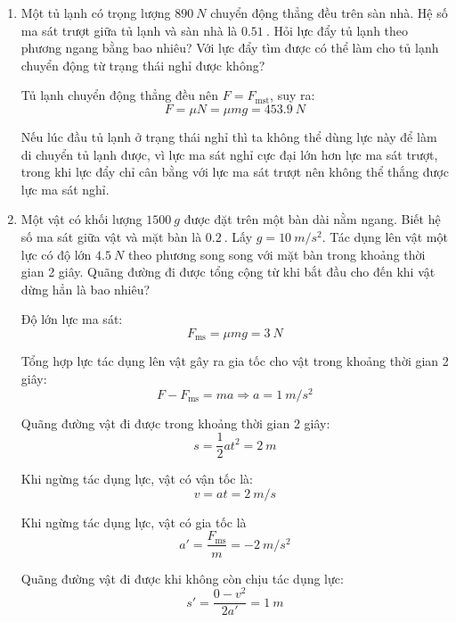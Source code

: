 \begin{enumerate}[label=\bfseries Câu \arabic*:]
	
	\item {}
	
	
	{Một tủ lạnh có trọng lượng $\SI{890}{N}$ chuyển động thẳng đều trên sàn nhà. Hệ số ma sát trượt giữa tủ lạnh và sàn nhà là $\SI{0.51}{}$. Hỏi lực đẩy tủ lạnh theo phương ngang bằng bao nhiêu? Với lực đẩy tìm được có thể làm cho tủ lạnh chuyển động từ trạng thái nghỉ được không?
		
	}
	
	\hideall
	{Tủ lạnh chuyển động thẳng đều nên $F=F_\text{mst}$, suy ra:
		$$F=\mu N = \mu mg = \SI{453.9}{N}$$
		
		Nếu lúc đầu tủ lạnh ở trạng thái nghỉ thì ta không thể dùng lực này để làm di chuyển tủ lạnh được, vì lực ma sát nghỉ cực đại lớn hơn lực ma sát trượt, trong khi lực đẩy chỉ cân bằng với lực ma sát trượt nên không thể thắng được lực ma sát nghỉ.
	}
	\item {}
	
	
	{Một vật có khối lượng $\SI{1500}{g}$ được đặt trên một bàn dài nằm ngang. Biết hệ số ma sát giữa vật và mặt bàn là $\SI{0.2}{}$. Lấy $g=\SI{10}{m/s^2}$. Tác dụng lên vật một lực có độ lớn $\SI{4.5}{N}$ theo phương song song với mặt bàn trong khoảng thời gian 2 giây. Quãng đường đi được tổng cộng từ khi bắt đầu cho đến khi vật dừng hẳn là bao nhiêu?
	}
	
	\hideall
	{
		Độ lớn lực ma sát:
		$$F_\text{ms} = \mu mg = \SI{3}{N}$$
		
		Tổng hợp lực tác dụng lên vật gây ra gia tốc cho vật trong khoảng thời gian 2 giây:
		$$F-F_\text{ms} = ma \Rightarrow a = \SI{1}{m/s^2}$$
		
		Quãng đường vật đi được trong khoảng thời gian 2 giây:
		$$s=\dfrac{1}{2}at^2 = \SI{2}{m}$$
		
		Khi ngừng tác dụng lực, vật có vận tốc là:
		$$v=at=\SI{2}{m/s}$$
		
		
		Khi ngừng tác dụng lực, vật có gia tốc là
		$$a'=\dfrac{F_\text{ms}}{m} = \SI{-2}{m/s^2}$$
		
		Quãng đường vật đi được khi không còn chịu tác dụng lực:
		$$s' = \dfrac{0-v^2}{2a'} = \SI{1}{m}$$
		
}
\end{enumerate}
